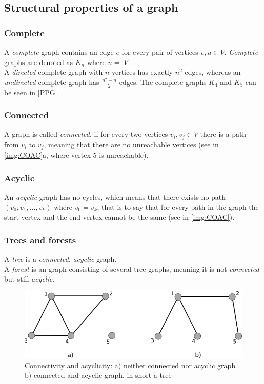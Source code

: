 \subsection*{Structural properties of a graph}
\subsubsection{Complete} 
A \textit{complete} graph contains an edge $e$ for every pair of vertices $v, u \in V$. \textit{Complete} graphs are denoted as $K_n$ where $n = |V|$.\\
A \textit{directed} complete graph with $n$ vertices has exactly $n^2$ edges, whereas an \textit{undirected} complete graph has $\frac{n^2 -n}{2}$ edges. The complete graphs $K_4$ and $K_5$ can be seen in \autoref{PPG}.
\subsubsection{Connected}
A graph is called \textit{connected}, if for every two vertices $v_i, v_j \in V$ there is a path from $v_i$ to $v_j$, meaning that there are no unreachable vertices (see in \autoref{img:COAC}a, where vertex 5 is unreachable).
\subsubsection{Acyclic}
An \textit{acyclic} graph has no cycles, which means that there exists no path $(v_0, v_1,...,v_k)$ where $v_0 = v_k$, that is to say that for every path in the graph the start vertex and the end vertex cannot be the same (see in \autoref{img:COAC}).
\subsubsection{Trees and forests}
A \textit{tree} is a \textit{connected}, \textit{acyclic} graph.\\
A \textit{forest} is an graph consisting of several tree graphs, meaning it is not \textit{connected} but still \textit{acyclic}.
\begin{figure}[h!]
\begin{center}
\includegraphics[width= \textwidth]{figures/ConnectedAcyclic.png}
\caption{Connectivity and acyclicity: a) neither connected nor acyclic graph b) connected and acyclic graph, in short a tree}
\label{img:COAC}
\end{center}
\end{figure}
